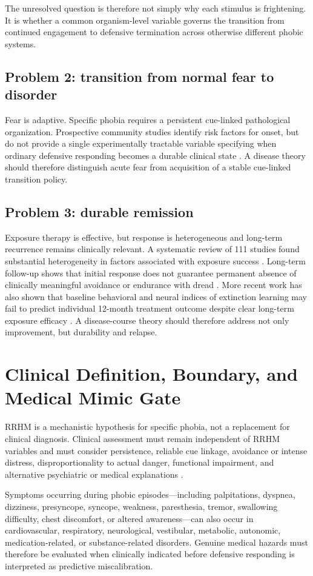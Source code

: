 \documentclass[9pt,twocolumn]{article}
\begin{document}
The unresolved question is therefore not simply why each stimulus is frightening. It is whether a common organism-level variable governs the transition from continued engagement to defensive termination across otherwise different phobic systems.

\subsection{Problem 2: transition from normal fear to disorder}
Fear is adaptive. Specific phobia requires a persistent cue-linked pathological organization. Prospective community studies identify risk factors for onset, but do not provide a single experimentally tractable variable specifying when ordinary defensive responding becomes a durable clinical state \cite{trumpf2010incidence}. A disease theory should therefore distinguish acute fear from acquisition of a stable cue-linked transition policy.

\subsection{Problem 3: durable remission}
Exposure therapy is effective, but response is heterogeneous and long-term recurrence remains clinically relevant. A systematic review of 111 studies found substantial heterogeneity in factors associated with exposure success \cite{bohnlein2020}. Long-term follow-up shows that initial response does not guarantee permanent absence of clinically meaningful avoidance or endurance with dread \cite{lipsitz1999}. More recent work has also shown that baseline behavioral and neural indices of extinction learning may fail to predict individual 12-month treatment outcome despite clear long-term exposure efficacy \cite{devos2025}. A disease-course theory should therefore address not only improvement, but durability and relapse.

\section{Clinical Definition, Boundary, and Medical Mimic Gate}
RRHM is a mechanistic hypothesis for specific phobia, not a replacement for clinical diagnosis. Clinical assessment must remain independent of RRHM variables and must consider persistence, reliable cue linkage, avoidance or intense distress, disproportionality to actual danger, functional impairment, and alternative psychiatric or medical explanations \cite{who2024}.

Symptoms occurring during phobic episodes---including palpitations, dyspnea, dizziness, presyncope, syncope, weakness, paresthesia, tremor, swallowing difficulty, chest discomfort, or altered awareness---can also occur in cardiovascular, respiratory, neurological, vestibular, metabolic, autonomic, medication-related, or substance-related disorders. Genuine medical hazards must therefore be evaluated when clinically indicated before defensive responding is interpreted as predictive miscalibration.
\end{document}
